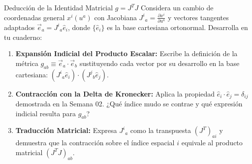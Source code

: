 \documentclass[10pt,aspectratio=169]{beamer}
\begin{document}
\begin{frame}{Deducción de la Identidad Matricial $g = J^T J$}
  \vspace{0.05cm}
  Considera un cambio de coordenadas general $x^i(u^a)$ con Jacobiana $J^i{}_a = \frac{\partial x^i}{\partial u^a}$ y vectores tangentes adaptados $\vec{e}_a = J^i{}_a \hat{e}_i$, donde $\{\hat{e}_i\}$ es la base cartesiana ortonormal. Desarrolla en tu cuaderno:
  \vspace{0.22cm}
  \begin{enumerate}\itemsep10pt
    \item[(a)] \textbf{Expansión Indicial del Producto Escalar:} Escribe la definición de la métrica $g_{ab} \equiv \vec{e}_a \cdot \vec{e}_b$ sustituyendo cada vector por su desarrollo en la base cartesiana: $(J^i{}_a \hat{e}_i) \cdot (J^j{}_b \hat{e}_j)$.
    \item[(b)] \textbf{Contracción con la Delta de Kronecker:} Aplica la propiedad $\hat{e}_i \cdot \hat{e}_j = \delta_{ij}$ demostrada en la Semana 02. ¿Qué índice mudo se contrae y qué expresión indicial resulta para $g_{ab}$?
    \item[(c)] \textbf{Traducción Matricial:} Expresa $J^i{}_a$ como la transpuesta $(J^T)_{ai}$ y demuestra que la contracción sobre el índice espacial $i$ equivale al producto matricial $(J^T J)_{ab}$.
  \end{enumerate}
\end{frame}
\end{document}
